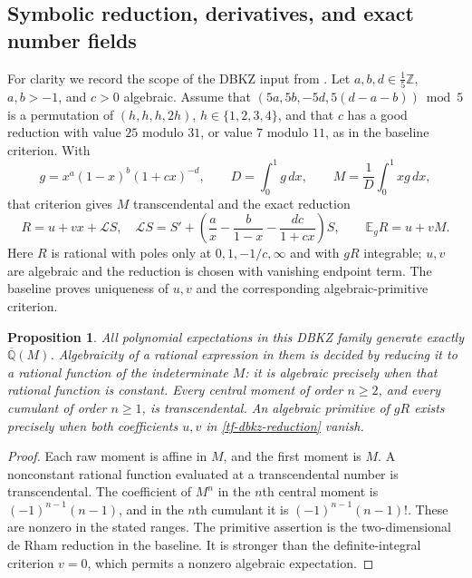 \documentclass[11pt,a4paper]{article}
\newtheorem{proposition}[theorem]{Proposition}
\theoremstyle{definition}
\theoremstyle{remark}
\numberwithin{equation}{section}
\newcommand{\Qbar}{\overline{\mathbb Q}}
\begin{document}
\subsection{Symbolic reduction, derivatives, and exact number fields}
\label{tf-symbolic-section}

For clarity we record the scope of the DBKZ input from \cite{tf-baseline}.
Let $a,b,d\in\tfrac15\mathbb Z$, $a,b>-1$, and $c>0$ algebraic.
Assume that
$(5a,5b,-5d,5(d-a-b))\bmod5$ is a permutation of
$(h,h,h,2h)$, $h\in\{1,2,3,4\}$, and that $c$ has a good reduction
with value $25$ modulo $31$, or value $7$ modulo $11$, as in the
baseline criterion.  With
\[
 g=x^a(1-x)^b(1+cx)^{-d},\qquad D=\int_0^1g\,dx,
 \qquad M=\frac1D\int_0^1xg\,dx,
\]
that criterion gives $M$ transcendental and the exact reduction
\begin{equation}\label{tf-dbkz-reduction}
 R=u+vx+\mathcal LS,\quad
 \mathcal LS=S'+\left(\frac ax-\frac b{1-x}
                         -\frac{dc}{1+cx}\right)S,
 \qquad \mathbb E_gR=u+vM.
\end{equation}
Here $R$ is rational with poles only at $0,1,-1/c,\infty$ and with
$gR$ integrable; $u,v$ are algebraic and the reduction is chosen with
vanishing endpoint term.  The baseline proves uniqueness of $u,v$
and the corresponding algebraic-primitive criterion.

\begin{proposition}\label{tf-symbolic}
All polynomial expectations in this DBKZ family generate exactly
$\Qbar(M)$.  Algebraicity of a rational expression in them is decided
by reducing it to a rational function of the indeterminate $M$:
it is algebraic precisely when that rational function is constant.
Every central moment of order $n\ge2$, and every cumulant of order
$n\ge1$, is transcendental.  An algebraic primitive of $gR$ exists
precisely when both coefficients $u,v$ in
\eqref{tf-dbkz-reduction} vanish.
\end{proposition}
\begin{proof}
Each raw moment is affine in $M$, and the first moment is $M$.
A nonconstant rational function evaluated at a transcendental number
is transcendental.  The coefficient of $M^n$ in the $n$th central
moment is $(-1)^{n-1}(n-1)$, and in the $n$th cumulant it is
$(-1)^{n-1}(n-1)!$.  These are nonzero in the stated ranges.
The primitive assertion is the two-dimensional de Rham reduction in
the baseline.  It is stronger than the definite-integral criterion
$v=0$, which permits a nonzero algebraic expectation.
\end{proof}
\end{document}
